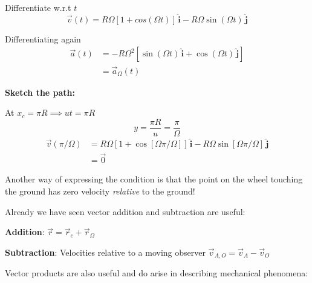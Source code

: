 \documentclass[twoside]{scrartcl}
\let\oldhat\hat
\renewcommand{\hat}[1]{\,\oldhat{\boldsymbol{\mathbf{#1}}}}
\begin{document}
\begin{example}
Differentiate w.r.t $t$
\[\vec{v}(t) = R\Omega[1+ cos(\Omega t)]\hat{i} - R\Omega\sin(\Omega t)\hat{j}\]

Differentiating again
\[\begin{aligned}
\vec{a}(t) &= -R\Omega^2[\sin(\Omega t)\hat{i} + \cos(\Omega t)\hat{j}]\\
&= \vec{a}_\Omega(t)
\end{aligned}
\]

\textbf{Sketch the path:}
\begin{center}
  \end{center} 
At $x_c = \pi R \implies ut = \pi R$
\[y = \frac{\pi R}{u} = \frac{\pi}{\Omega}\]
\[\begin{aligned}
	\vec{v}(\pi/\Omega) &= R\Omega[1 + \cos[\Omega \pi/\Omega]]\hat{i} - R\Omega\sin[\Omega\pi/\Omega]\hat{j}\\
	&= \vec{0}
\end{aligned}
 \]
 
 Another way of expressing the condition is that the point on the wheel touching the ground has zero velocity \emph{relative} to the ground!

\end{example}



Already  we have seen vector addition and subtraction are useful:

\textbf{Addition}: $\vec{r} = \vec{r}_c + \vec{r}_\Omega$

\textbf{Subtraction}: Velocities relative to a moving observer $\vec{v}_{A,O} = \vec{v}_A - \vec{v}_O$


 Vector products are also useful and do arise in describing mechanical phenomena: 
\end{document}
